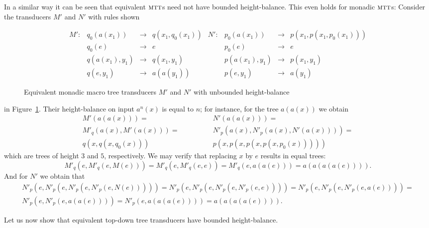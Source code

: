 \documentclass[copyright,creativecommons]{eptcs}
\newcommand{\mtt}{\textsc{mtt}}
\begin{document}
In a similar way it can be seen that equivalent $\mtt$s need
not have bounded height-balance.
This even holds for monadic $\mtt$s:
Consider the transducers $M'$ and $N'$ with rules shown
\begin{figure}[htb]
\[
\begin{array}{llclllcl}
M':&q_0(a(x_1))&\to& q(x_1,q_0(x_1))
  &N':& p_0(a(x_1))&\to& p(x_1,p(x_1,p_0(x_1)))\\
&q_0(e)&\to&e&& p_0(e)&\to&e\\
&q(a(x_1),y_1)&\to&q(x_1,y_1)&&p(a(x_1),y_1)&\to&p(x_1,y_1)\\
&q(e,y_1)&\to&a(a(y_1))&&p(e,y_1)&\to&a(y_1)
\end{array}
\]
\caption{Equivalent monadic macro tree transducers $M'$ and $N'$
with unbounded height-balance}\label{fig:mon}
\end{figure}
in Figure~\ref{fig:mon}.
Their height-balance on input $a^n(x)$ is equal to $n$; for instance,
for the tree $a(a(x))$ we obtain
\[
\begin{array}{ll}
M'(a(a(x)))= & N'(a(a(x)))=\\
M'_q(a(x), M'(a(x)))=\qquad\qquad & N'_p(a(x), N'_p(a(x), N'(a(x))))=\\
q(x, q(x, q_0(x))) &  p(x, p(x, p(x, p(x, p_0(x)))))
\end{array}
\]
which are trees of height $3$ and $5$, respectively.
We may verify that replacing $x$ by $e$ results in equal trees:
\[
M'_q(e, M'_q(e, M(e)))=M'_q(e, M'_q(e,e))= 
M'_q(e, a(a(e)))= a(a(a(a(e)))).
\]
And for $N'$ we obtain that
\begin{multline*}
N'_p(e, N'_p(e, N'_p(e, N'_p(e, N(e)))))=
N'_p(e, N'_p(e, N'_p(e, N'_p(e,e))))=
N'_p(e, N'_p(e, N'_p(e, a(e))))=\\
N'_p(e, N'_p(e, a(a(e))))=
N'_p(e, a(a(a(e))))=
a(a(a(a(e)))).
\end{multline*}

Let us now show that equivalent top-down tree transducers 
have bounded height-balance.
\end{document}
